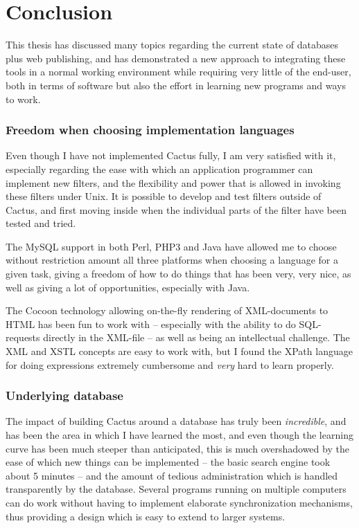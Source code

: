 \chapter{Conclusion}

This thesis has discussed many topics regarding the current state of
databases plus web publishing, and has demonstrated a new approach to
integrating these tools in a normal working environment while
requiring very little of the end-user, both in terms of software but
also the effort in learning new programs and ways to work.

\subsection*{Freedom when choosing implementation languages}

Even though I have not implemented Cactus fully, I am very satisfied
with it, especially regarding the ease with which an application
programmer can implement new filters, and the flexibility and power
that is allowed in invoking these filters under Unix.  It is possible
to develop and test filters outside of Cactus, and first moving inside
when the individual parts of the filter have been tested and tried.

The MySQL support in both Perl, PHP3 and Java have allowed me to
choose without restriction amount all three platforms when choosing a
language for a given task, giving a freedom of how to do things that
has been very, very nice, as well as giving a lot of opportunities,
especially with Java.

The Cocoon technology allowing on-the-fly rendering of XML-documents
to HTML has been fun to work with -- especially with the ability to do
SQL-requests directly in the XML-file -- as well as being an
intellectual challenge.  The XML and XSTL concepts are easy to work
with, but I found the XPath language for doing expressions extremely
cumbersome and \textit{very} hard to learn properly.



\subsection*{Underlying database}

The impact of building Cactus around a database has truly been
\textit{incredible}, and has been the area in which I have learned the
most, and even though the learning curve has been much steeper than
anticipated, this is much overshadowed by the ease of which new things
can be implemented -- the basic search engine took about 5 minutes -- and
the amount of tedious administration which is handled transparently by
the database.  Several programs running on multiple computers can do
work without having to implement elaborate synchronization mechanisms,
thus providing a design which is easy to extend to larger systems.

